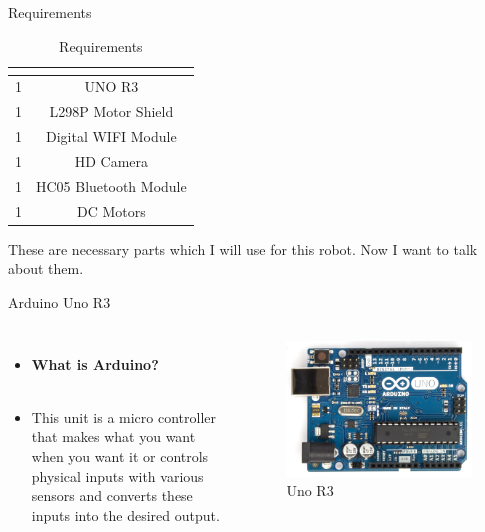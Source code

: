 \documentclass[xcolor=table, 9pt]{beamer}
\begin{document}
\begin{frame}{Requirements}
\begin{table}[h]
\centering 
\begin{tabular}{|c|c|}
 \hline
 \textbf{\emph{\cellcolor{red!27}{\small Number}}} & \textbf{\emph{\cellcolor{red!27}{\small Needed}}}	\\ [0.5ex] \hline
 1 &{\small  UNO R3} \\  \hline
 1 & {\small L298P Motor Shield} \\  \hline
 1 & {\small Digital WIFI Module} \\  \hline
 1 & {\small HD Camera} \\  \hline
 1 & {\small HC05 Bluetooth Module} \\ \hline
 1 & {\small DC Motors} \\
 \hline
\end{tabular}
\caption{Requirements}
\label{table:1}
\end{table}
These are necessary parts which I will use for this robot. Now I want to talk about them.
\end{frame}




\begin{frame}{Arduino Uno R3}
\begin{columns}[c] 

\begin{itemize}
\item[] \textbf{What is Arduino?}\\~\\
\item[] This unit is a micro controller that makes what you want when you want it or controls physical inputs with various sensors and converts these inputs into the desired output. 
\end{itemize}
\begin{figure}
\includegraphics[width=0.7\linewidth]{arduino.png}
\caption{Uno R3}
\end{figure}
\end{columns}
\end{frame}
\end{document}

